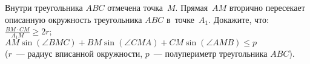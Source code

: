 \begin{problems}
\item
Внутри треугольника $ABC$ отмечена точка~$M$.
Прямая~$AM$ вторично пересекает описанную окружность треугольника $ABC$
в~точке~$A_1$.
Докажите, что:
\\[0.5ex]
\subproblem
\( \displaystyle
    \frac{BM \cdot CM}{A_1 M}
\geq
    2 r
\);
\\[0.5ex]
\subproblem
\(
    AM \sin( \angle BMC) + BM \sin( \angle CMA) + CM \sin( \angle AMB)
\leq
    p
\)\\
($r$~--- радиус вписанной окружности, $p$~--- полупериметр треугольника $ABC$).

\end{problems}

